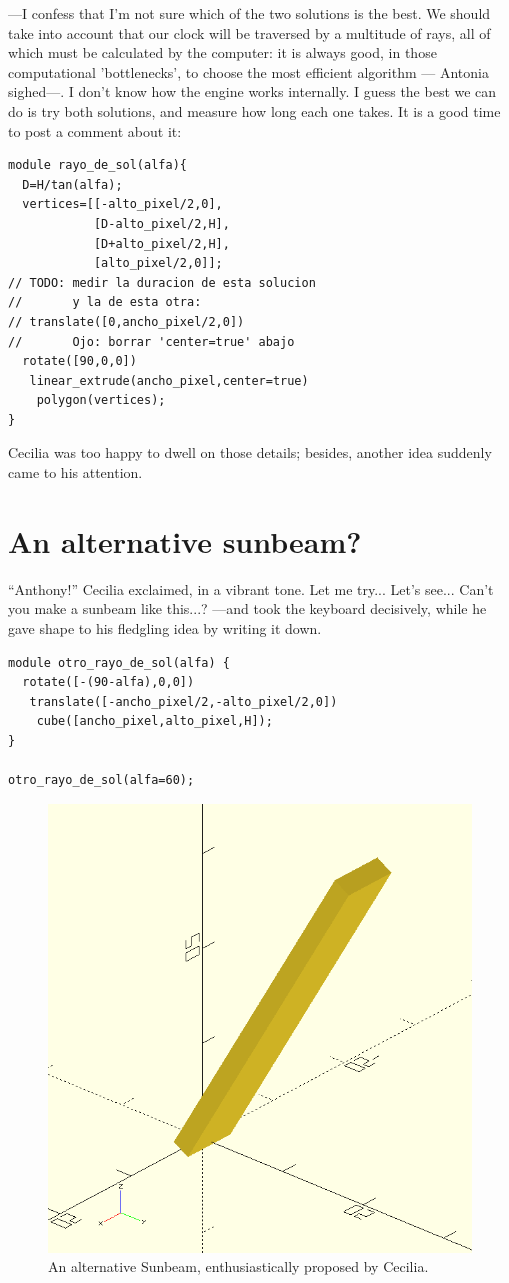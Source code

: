 ---I confess that I'm not sure which of the two solutions is the best. We should take into account that our clock will be traversed by a multitude of rays, all of which must be calculated by the computer: it is always good, in those computational 'bottlenecks', to choose the most efficient algorithm --- Antonia sighed---. I don't know how the \openscad{} engine works internally. I guess the best we can do is try both
solutions, and measure how long each one takes. It is a good time to post a comment about it:

\begin{lstlisting}
module rayo_de_sol(alfa){
  D=H/tan(alfa);
  vertices=[[-alto_pixel/2,0],
            [D-alto_pixel/2,H],
            [D+alto_pixel/2,H],
            [alto_pixel/2,0]];
// TODO: medir la duracion de esta solucion
//       y la de esta otra:
// translate([0,ancho_pixel/2,0])
//       Ojo: borrar 'center=true' abajo
  rotate([90,0,0])
   linear_extrude(ancho_pixel,center=true)
    polygon(vertices);
}
\end{lstlisting}


Cecilia was too happy to dwell on those details; besides, another idea suddenly came to his attention.

\section{An alternative sunbeam?}

``Anthony!'' Cecilia exclaimed, in a vibrant tone. Let me try... Let's see... Can't you make a sunbeam like this...? ---and took the keyboard decisively, while he gave shape to his fledgling idea by writing it down.

\begin{lstlisting}
module otro_rayo_de_sol(alfa) {
  rotate([-(90-alfa),0,0])
   translate([-ancho_pixel/2,-alto_pixel/2,0])
    cube([ancho_pixel,alto_pixel,H]);  
}

otro_rayo_de_sol(alfa=60);
\end{lstlisting}


\begin{figure}[ht]
  \centering
  \includegraphics[width=.5\textwidth]{imagenes/otro-rayo.png}
  \caption[An alternative Sunbeam]{An alternative Sunbeam, enthusiastically proposed by Cecilia.}
  \label{fig:otro-rayo}
\end{figure}
  

